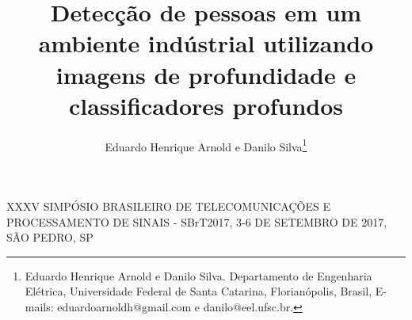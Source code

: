 \documentclass{sbrt2017port}
\begin{document}
\title{Detecção de pessoas em um ambiente indústrial utilizando imagens de profundidade e classificadores profundos}

\author{Eduardo Henrique Arnold e Danilo Silva\thanks{Eduardo Henrique Arnold e Danilo Silva. Departamento de Engenharia Elétrica, Universidade Federal de Santa Catarina, Florianópolis, Brasil, E-mails: eduardoarnoldh@gmail.com e danilo@eel.ufsc.br. } }

\maketitle

 {XXXV SIMPÓSIO BRASILEIRO DE TELECOMUNICAÇÕES E PROCESSAMENTO DE SINAIS - SBrT2017, 3-6 DE SETEMBRO DE 2017, SÃO PEDRO, SP}



\nocite{*}


\end{document}
